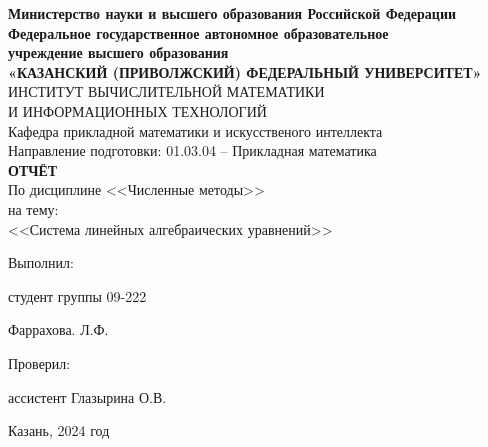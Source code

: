 \documentclass[a4paper,12pt]{article}
\begin{document}
\begin{center}
\hfill \break
\textbf{\large{Министерство науки и высшего образования Российской Федерации\\
Федеральное государственное автономное образовательное\\
учреждение высшего образования}}
\\
\large{\textbf{«КАЗАНСКИЙ (ПРИВОЛЖСКИЙ) ФЕДЕРАЛЬНЫЙ УНИВЕРСИТЕТ»}}\\
\hfill \break
\large{ИНСТИТУТ ВЫЧИСЛИТЕЛЬНОЙ МАТЕМАТИКИ\\ И ИНФОРМАЦИОННЫХ ТЕХНОЛОГИЙ}\\
\hfill \break
\large{Кафедра прикладной математики и искусственого интеллекта}\\
\hfill\break
\hfill \break
\large{Направление подготовки: 01.03.04 – Прикладная математика}\\
\hfill \break
\hfill \break
\textbf{\large{ОТЧЁТ}}\\
\large{По дисциплине <<Численные методы>>}\\
\large{на тему:}\\
\large{<<Система линейных алгебраических уравнений>>}\\
\hfill \break
\hfill \break
\end{center}

\hfill \break
\begin{flushright}
			
    \large{Выполнил:}
    
    \large{студент группы 09-222}
    
    \large{Фаррахова. Л.Ф.}
    
    \large{Проверил:}
    
    \large{ассистент Глазырина О.В.}
    
\end{flushright}
\vfill
\begin{center} \large{Казань, 2024 год} \end{center}
\thispagestyle{empty}
 
\end{document}
